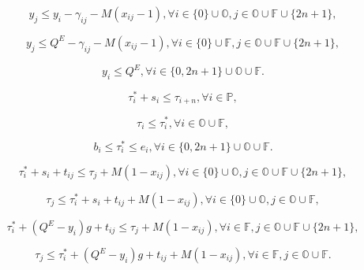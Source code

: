 \documentclass[11pt]{ctexart}
\begin{document}
\begin{equation}
    \label{eq:14}
    y_j \le y_i - \gamma_{ij} - M(x_{ij} - 1), \forall i \in \{0\} \cup \mathbb{O}, j \in \mathbb{O} \cup \mathbb{F} \cup \{2n + 1\}, \tag{14}
\end{equation}

\begin{equation}
    \label{eq:15}
    y_j \le Q^E - \gamma_{ij} - M(x_{ij} - 1), \forall i \in \{0\} \cup \mathbb{F}, j \in \mathbb{O} \cup \mathbb{F} \cup \{2n + 1\}, \tag{15}
\end{equation}

\begin{equation}
    \label{eq:16}
    y_i \le Q^E, \forall i \in \{0, 2n + 1\} \cup \mathbb{O} \cup \mathbb{F}. \tag{16}
\end{equation}

\begin{equation}
    \label{eq:17}
    \tau_i^* + s_i \le \tau_{i+n}, \forall i \in \mathbb{P}, \tag{17}
\end{equation}

\begin{equation}
    \label{eq:18}
    \tau_i \le \tau_i^*, \forall i \in \mathbb{O} \cup \mathbb{F}, \tag{18}
\end{equation}

\begin{equation}
    \label{eq:19}
    b_i \le \tau_i^* \le e_i, \forall i \in \{0, 2n + 1\} \cup \mathbb{O} \cup \mathbb{F}. \tag{19}
\end{equation}

\begin{equation}
    \label{eq:20}
    \tau_i^* + s_i + t_{ij} \le \tau_j + M(1 - x_{ij}), \forall i \in \{0\} \cup \mathbb{O}, j \in \mathbb{O} \cup \mathbb{F} \cup \{2n + 1\}, \tag{20}
\end{equation}

\begin{equation}
    \label{eq:21}
    \tau_j \le \tau_i^* + s_i + t_{ij} + M(1 - x_{ij}), \forall i \in \{0\} \cup \mathbb{O}, j \in \mathbb{O} \cup \mathbb{F}, \tag{21}
\end{equation}

\begin{equation}
    \label{eq:22}
    \tau_i^* + (Q^E - y_i)g + t_{ij} \le \tau_j + M(1 - x_{ij}), \forall i \in \mathbb{F}, j \in \mathbb{O} \cup \mathbb{F} \cup \{2n + 1\}, \tag{22}
\end{equation}

\begin{equation}
    \label{eq:23}
    \tau_j \le \tau_i^* + (Q^E - y_i)g + t_{ij} + M(1 - x_{ij}), \forall i \in \mathbb{F}, j \in \mathbb{O} \cup \mathbb{F}. \tag{23}
\end{equation}
\end{document}
